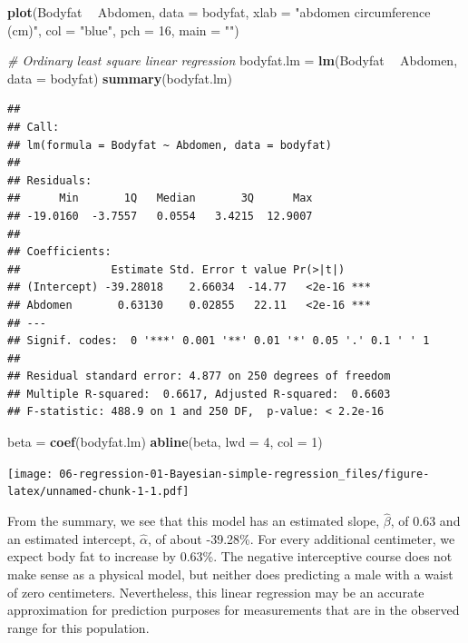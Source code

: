 \documentclass[]{book}
\newenvironment{Shaded}{\begin{snugshade}}{\end{snugshade}}
\newcommand{\KeywordTok}[1]{\textcolor[rgb]{0.13,0.29,0.53}{\textbf{#1}}}
\newcommand{\DataTypeTok}[1]{\textcolor[rgb]{0.13,0.29,0.53}{#1}}
\newcommand{\DecValTok}[1]{\textcolor[rgb]{0.00,0.00,0.81}{#1}}
\newcommand{\StringTok}[1]{\textcolor[rgb]{0.31,0.60,0.02}{#1}}
\newcommand{\CommentTok}[1]{\textcolor[rgb]{0.56,0.35,0.01}{\textit{#1}}}
\newcommand{\OperatorTok}[1]{\textcolor[rgb]{0.81,0.36,0.00}{\textbf{#1}}}
\newcommand{\NormalTok}[1]{#1}
\theoremstyle{definition}
\theoremstyle{definition}
\theoremstyle{definition}
\theoremstyle{remark}
\begin{document}
\begin{Shaded}
\begin{Highlighting}[]
\KeywordTok{plot}\NormalTok{(Bodyfat }\OperatorTok{~}\StringTok{ }\NormalTok{Abdomen, }\DataTypeTok{data =}\NormalTok{ bodyfat, }
     \DataTypeTok{xlab =} \StringTok{"abdomen circumference (cm)"}\NormalTok{, }
     \DataTypeTok{col =} \StringTok{"blue"}\NormalTok{, }\DataTypeTok{pch =} \DecValTok{16}\NormalTok{, }\DataTypeTok{main =} \StringTok{""}\NormalTok{)}

\CommentTok{# Ordinary least square linear regression}
\NormalTok{bodyfat.lm =}\StringTok{ }\KeywordTok{lm}\NormalTok{(Bodyfat }\OperatorTok{~}\StringTok{ }\NormalTok{Abdomen, }\DataTypeTok{data =}\NormalTok{ bodyfat)}
\KeywordTok{summary}\NormalTok{(bodyfat.lm)}
\end{Highlighting}
\end{Shaded}

\begin{verbatim}
## 
## Call:
## lm(formula = Bodyfat ~ Abdomen, data = bodyfat)
## 
## Residuals:
##      Min       1Q   Median       3Q      Max 
## -19.0160  -3.7557   0.0554   3.4215  12.9007 
## 
## Coefficients:
##              Estimate Std. Error t value Pr(>|t|)    
## (Intercept) -39.28018    2.66034  -14.77   <2e-16 ***
## Abdomen       0.63130    0.02855   22.11   <2e-16 ***
## ---
## Signif. codes:  0 '***' 0.001 '**' 0.01 '*' 0.05 '.' 0.1 ' ' 1
## 
## Residual standard error: 4.877 on 250 degrees of freedom
## Multiple R-squared:  0.6617, Adjusted R-squared:  0.6603 
## F-statistic: 488.9 on 1 and 250 DF,  p-value: < 2.2e-16
\end{verbatim}

\begin{Shaded}
\begin{Highlighting}[]
\NormalTok{beta =}\StringTok{ }\KeywordTok{coef}\NormalTok{(bodyfat.lm)}
\KeywordTok{abline}\NormalTok{(beta, }\DataTypeTok{lwd =} \DecValTok{4}\NormalTok{, }\DataTypeTok{col =} \DecValTok{1}\NormalTok{)}
\end{Highlighting}
\end{Shaded}

\texttt{[image: 06-regression-01-Bayesian-simple-regression\_files/figure-latex/unnamed-chunk-1-1.pdf]}

From the summary, we see that this model has an estimated slope,
\(\hat{\beta}\), of 0.63 and an estimated intercept, \(\hat{\alpha}\),
of about -39.28\%. For every additional centimeter, we expect body fat
to increase by 0.63\%. The negative interceptive course does not make
sense as a physical model, but neither does predicting a male with a
waist of zero centimeters. Nevertheless, this linear regression may be
an accurate approximation for prediction purposes for measurements that
are in the observed range for this population.
\end{document}
